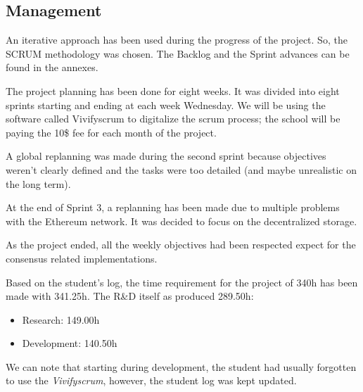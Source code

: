
\subsection{Management}
An iterative approach has been used during the progress of the project. So, the SCRUM methodology was chosen. The Backlog and the Sprint advances can be found in the annexes.

The project planning has been done for eight weeks. It was divided into eight sprints starting and ending at each week Wednesday. We will be using the software called Vivifyscrum to digitalize the scrum process; the school will be paying the 10\$ fee for each month of the project.

A global replanning was made during the second sprint because objectives weren't clearly defined and the tasks were too detailed (and maybe unrealistic on the long term).

At the end of Sprint 3, a replanning has been made due to multiple problems with the Ethereum network. It was decided to focus on the decentralized storage.

As the project ended, all the weekly objectives had been respected expect for the consensus related implementations.

Based on the student's log, the time requirement for the project of 340h has been made with 341.25h. The R\&D itself as produced 289.50h:

\begin{itemize}
\item Research: 149.00h
\item Development: 140.50h
\end{itemize}

We can note that starting during development, the student had usually forgotten to use the \textit{Vivifyscrum}, however, the student log was kept updated.

